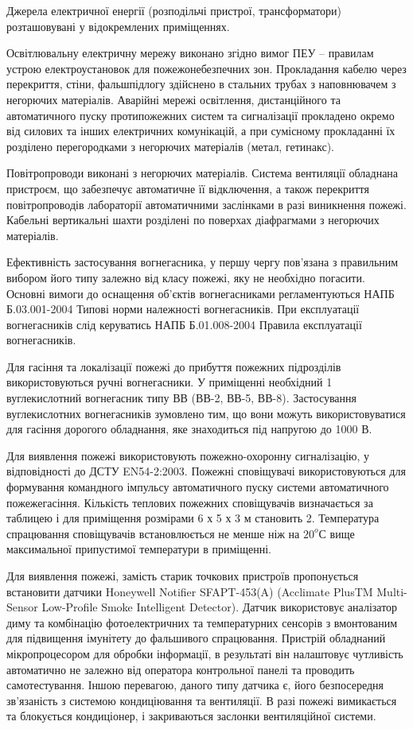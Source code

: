 \documentclass[ukrainian,utf8,simple,floatsubsection, hpadding=5mm,equationsubsection,]{eskdtext}
\begin{document}
Джерела електричної енергії (розподільчі пристрої, трансформатори) розташовувані у відокремлених приміщеннях.

Освітлювальну електричну мережу виконано згідно вимог ПЕУ – правилам устрою електроустановок для пожежонебезпечних зон.
Прокладання кабелю через перекриття, стіни, фальшпідлогу здійснено в стальних трубах з наповнювачем з негорючих матеріалів. Аварійні мережі освітлення, дистанційного та автоматичного пуску протипожежних систем та сигналізації 
прокладено окремо від силових та інших електричних комунікацій, а при сумісному прокладанні їх 
розділено перегородками з негорючих матеріалів (метал, гетинакс).


Повітропроводи виконані з негорючих матеріалів. Система вентиляції обладнана пристроєм, що 
забезпечує автоматичне її відключення, а також перекриття повітропроводів лабораторії 
автоматичними заслінками в разі виникнення пожежі. Кабельні вертикальні шахти розділені 
по поверхах діафрагмами з негорючих матеріалів.

Ефективність застосування вогнегасника, у першу чергу пов’язана з правильним вибором його типу залежно від класу пожежі, яку не необхідно погасити. Основні вимоги до оснащення об’єктів вогнегасниками регламентуються НАПБ Б.03.001-2004 Типові норми належності вогнегасників. При експлуатації вогнегасників слід керуватись НАПБ Б.01.008-2004 Правила експлуатації вогнегасників.

Для гасіння та локалізації пожежі до прибуття пожежних підрозділів використовуються ручні вогнегасники.  У приміщенні необхідний 1  вуглекислотний вогнегасник типу ВВ (ВВ-2, ВВ-5, ВВ-8). Застосування вуглекислотних вогнегасників зумовлено тим, що вони можуть використовуватися для гасіння дорогого обладнання, яке знаходиться під напругою до 1000 В. 

Для виявлення пожежі використовують пожежно-охоронну сигналізацію, у відповідності до ДСТУ EN54-2:2003. Пожежні сповіщувачі використовуються для формування командного імпульсу автоматичного пуску системи автоматичного пожежегасіння. Кількість теплових пожежних сповіщувачів визначається за таблицею і для приміщення розмірами 6 х 5 х 3 м становить 2. 
Температура спрацювання сповіщувачів встановлюється не менше ніж на $20^o$С вище 
максимальної припустимої температури в приміщенні.

Для виявлення пожежі, замість старик точкових пристроїв пропонується встановити датчики Honeywell Notifier SFAPT-453(A)
(Acclimate PlusTM Multi-Sensor Low-Profile Smoke Intelligent Detector). Датчик використовує аналізатор диму та комбінацію фотоелектричних та температурних сенсорів з вмонтованим для підвищення імунітету до фальшивого спрацювання. Пристрій обладнаний мікропроцесором для обробки інформації, в результаті він налаштовує чутливість автоматично не залежно від оператора контрольної панелі та проводить самотестування. Іншою перевагою, даного типу датчика є, його безпосередня зв'язаність з системою кондиціювання та вентиляції. В разі пожежі вимикається та блокується кондиціонер,
і закриваються заслонки вентиляційної системи.
\end{document}
